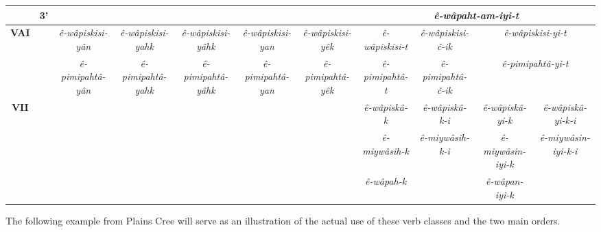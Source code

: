 \documentclass[twoside,a4paper,11pt]{article}
\newcommand{\ipa}[1]{{\phon\textit{#1}}}
\newcommand{\grise}[1]{\cellcolor{lightgray}\textbf{#1}}
\newcommand{\Σ}{\greek{Σ}}
\begin{document}
\begin{landscape}
\begin{table}[H]
{\begin{tabular}{ccccccccccc}
& 3'  &\grise{}  & \grise{}  & \grise{}  &\grise{}  &  \grise{}  &\multicolumn{4}{c}{\ipa{ê-wâpaht-am-iyi-t} }\\ 
\bottomrule
\multirow{2}{*}{\textbf{VAI}}  &  & \ipa{ê-wâpiskisi-yân} & \ipa{ê-wâpiskisi-yahk} & \ipa{ê-wâpiskisi-yâhk} &\ipa{ê-wâpiskisi-yan} &\ipa{ê-wâpiskisi-yêk} & \ipa{ê-wâpiskisi-t} & \ipa{ê-wâpiskisi-č-ik} & \multicolumn{2}{c}{\ipa{ê-wâpiskisi-yi-t}} \\
& & \ipa{ê-pimipahtâ-yân} & \ipa{ ê-pimipahtâ-yahk} & \ipa{ê-pimipahtâ-yâhk} &\ipa{ ê-pimipahtâ-yan} &\ipa{ ê-pimipahtâ-yêk} & \ipa{ê-pimipahtâ-t} & \ipa{ê-pimipahtâ-č-ik} & \multicolumn{2}{c}{\ipa{ê-pimipahtâ-yi-t}}\\
\bottomrule
\multirow{2}{*}{\textbf{VII}} &  &  \grise{}  &  \grise{}  &  \grise{} & \grise{}  & \grise{}  & \ipa{ê-wâpiskâ-k} & \ipa{ê-wâpiskâ-k-i} & \ipa{ê-wâpiskâ-yi-k} & \ipa{ê-wâpiskâ-yi-k-i}\\
 & &  \grise{}  &  \grise{}  &  \grise{} & \grise{}  & \grise{}  & \ipa{ê-miywâsih-k} & \ipa{ê-miywâsih-k-i}& \ipa{ê-miywâsin-iyi-k} & \ipa{ê-miywâsin-iyi-k-i}\\
  & &  \grise{}  &  \grise{}  &  \grise{} & \grise{}  & \grise{}  & \ipa{ê-wâpah-k} &\grise{} & \ipa{ê-wâpan-iyi-k} & \grise{}\\
 \bottomrule
\end{tabular}}
\end{table}

\end{landscape}

The following example from Plains Cree will serve as an illustration of the actual use of these verb classes and the two main orders.
\end{document}
